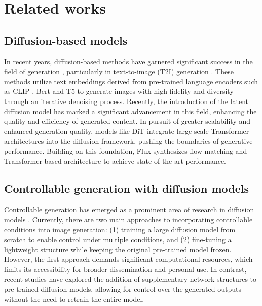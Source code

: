 \section{Related works}
\subsection{Diffusion-based models}
In recent years, diffusion-based methods have garnered significant success in the field of generation \cite{he2024idanimator, feng2024fancyvideo, zhang2024artbank}, particularly in text-to-image (T2I) generation \cite{guo2023animatediff,shuai2024survey}. These methods utilize text embeddings derived from pre-trained language encoders such as CLIP \cite{radford2021clip}, Bert \cite{devlin2018bert} and T5 \cite{raffel2020t5} to generate images with high fidelity and diversity through an iterative denoising process. Recently, the introduction of the latent diffusion model\cite{rombach2022ldm} has marked a significant advancement in this field, enhancing the quality and efficiency of generated content. In pursuit of greater scalability and enhanced generation quality, models like DiT \cite{peebles2023dit,chen2023PixArta}integrate large-scale Transformer architectures into the diffusion framework, pushing the boundaries of generative performance. Building on this foundation, Flux \cite{blackforestlabs2024flux} synthesizes flow-matching \cite{lipman2022flow} and Transformer-based architecture to achieve state-of-the-art performance.

\subsection{Controllable generation with diffusion models}
Controllable generation has emerged as a prominent area of research in diffusion models \cite{zhang2023controlnet, qin2023unicontrol, zhao2024unicontrolnet, chen2024PixArtc, peng2024controlnext}. Currently, there are two main approaches to incorporating controllable conditions into image generation: (1) training a large diffusion model from scratch to enable control under multiple conditions, and (2) fine-tuning a lightweight structure while keeping the original pre-trained model frozen. However, the first approach demands significant computational resources, which limits its accessibility for broader dissemination and personal use. In contrast, recent studies have explored the addition of supplementary network structures to pre-trained diffusion models, allowing for control over the generated outputs without the need to retrain the entire model.

